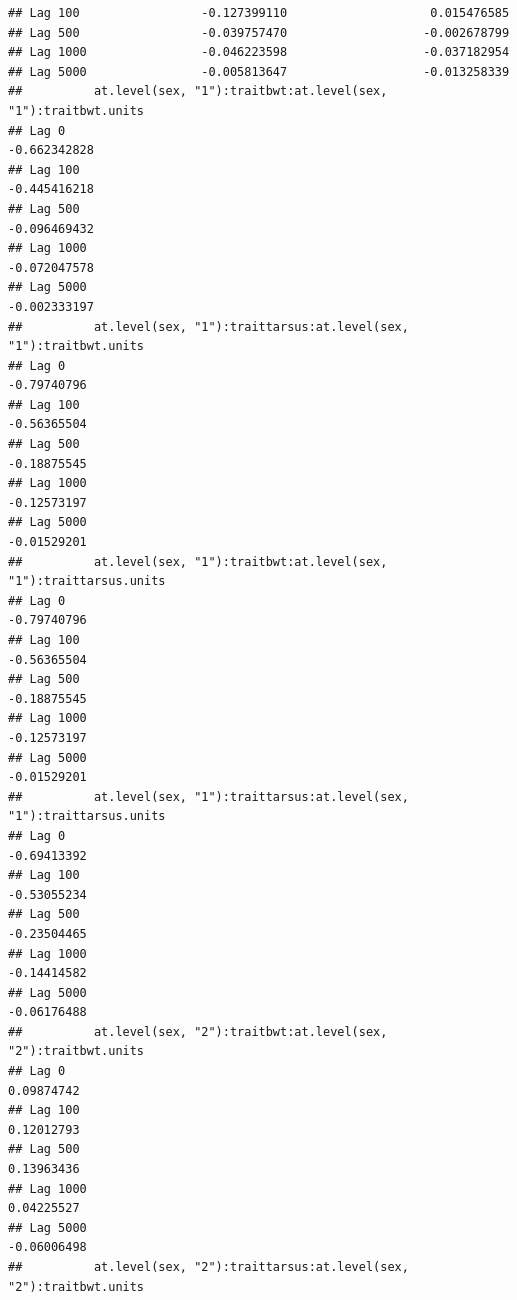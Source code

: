 \documentclass[
  12pt,
]{book}
\begin{document}
\begin{verbatim}
## Lag 100                 -0.127399110                    0.015476585
## Lag 500                 -0.039757470                   -0.002678799
## Lag 1000                -0.046223598                   -0.037182954
## Lag 5000                -0.005813647                   -0.013258339
##          at.level(sex, "1"):traitbwt:at.level(sex, "1"):traitbwt.units
## Lag 0                                                     -0.662342828
## Lag 100                                                   -0.445416218
## Lag 500                                                   -0.096469432
## Lag 1000                                                  -0.072047578
## Lag 5000                                                  -0.002333197
##          at.level(sex, "1"):traittarsus:at.level(sex, "1"):traitbwt.units
## Lag 0                                                         -0.79740796
## Lag 100                                                       -0.56365504
## Lag 500                                                       -0.18875545
## Lag 1000                                                      -0.12573197
## Lag 5000                                                      -0.01529201
##          at.level(sex, "1"):traitbwt:at.level(sex, "1"):traittarsus.units
## Lag 0                                                         -0.79740796
## Lag 100                                                       -0.56365504
## Lag 500                                                       -0.18875545
## Lag 1000                                                      -0.12573197
## Lag 5000                                                      -0.01529201
##          at.level(sex, "1"):traittarsus:at.level(sex, "1"):traittarsus.units
## Lag 0                                                            -0.69413392
## Lag 100                                                          -0.53055234
## Lag 500                                                          -0.23504465
## Lag 1000                                                         -0.14414582
## Lag 5000                                                         -0.06176488
##          at.level(sex, "2"):traitbwt:at.level(sex, "2"):traitbwt.units
## Lag 0                                                       0.09874742
## Lag 100                                                     0.12012793
## Lag 500                                                     0.13963436
## Lag 1000                                                    0.04225527
## Lag 5000                                                   -0.06006498
##          at.level(sex, "2"):traittarsus:at.level(sex, "2"):traitbwt.units

\end{verbatim}
\end{document}
